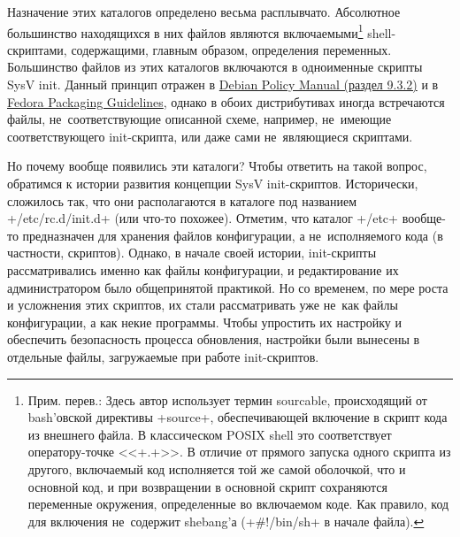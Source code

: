 \documentclass[10pt,oneside,a4paper]{article}
\begin{document}
Назначение этих каталогов определено весьма расплывчато. Абсолютное большинство
находящихся в них файлов являются включаемыми\footnote{Прим. перев.: Здесь автор
использует термин sourcable, происходящий от bash'овской директивы +source+,
обеспечивающей включение в скрипт кода из внешнего файла. В классическом POSIX
shell это соответствует оператору-точке <<+.+>>. В отличие от прямого запуска
одного скрипта из другого, включаемый код исполняется той же самой оболочкой,
что и основной код, и при возвращении в основной скрипт сохраняются переменные
окружения, определенные во включаемом коде. Как правило, код для включения
не~содержит shebang'а (+#!/bin/sh+ в начале файла).} shell-скриптами, содержащими,
главным образом, определения переменных. Большинство файлов из этих каталогов
включаются в одноименные скрипты SysV init. Данный принцип отражен в
\href{http://www.debian.org/doc/debian-policy/ch-opersys.html#s-sysvinit}{Debian
Policy Manual (раздел 9.3.2)} и в
\href{http://fedoraproject.org/wiki/Packaging:SysVInitScript}{Fedora Packaging
Guidelines}, однако в обоих дистрибутивах иногда встречаются файлы,
не~соответствующие описанной схеме, например, не~имеющие соответствующего
init-скрипта, или даже сами не~являющиеся скриптами.

Но почему вообще появились эти каталоги? Чтобы ответить на такой вопрос,
обратимся к истории развития концепции SysV init-скриптов. Исторически,
сложилось так, что они располагаются в каталоге под названием +/etc/rc.d/init.d+
(или что-то похожее).  Отметим, что каталог +/etc+ вообще-то предназначен для
хранения файлов конфигурации, а не~исполняемого кода (в частности, скриптов).
Однако, в начале своей истории, init-скрипты рассматривались именно как файлы
конфигурации, и редактирование их администратором было общепринятой практикой.
Но со временем, по мере роста и усложнения этих скриптов, их стали рассматривать
уже не~как файлы конфигурации, а как некие программы. Чтобы упростить их
настройку и обеспечить безопасность процесса обновления, настройки были вынесены
в отдельные файлы, загружаемые при работе init-скриптов.
\end{document}
